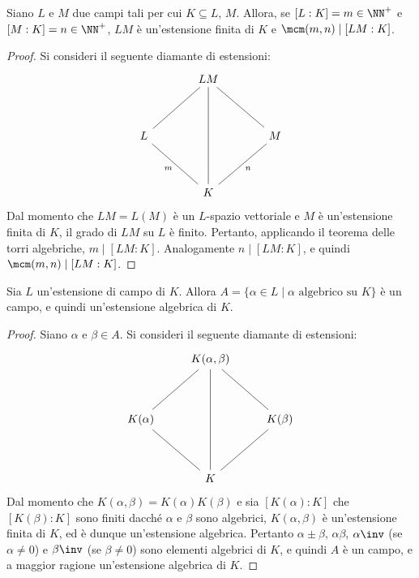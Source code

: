 \documentclass[12pt]{scrartcl}
\begin{document}
	\begin{proposition}
		Siano $L$ e $M$ due campi tali per cui
		$K \subseteq L$, $M$. Allora, se
		$[L : K] = m \in \NN^+$ e $[M : K] = n \in \NN^+$,
		$LM$ è un'estensione finita di $K$ e $\mcm(m, n) \mid [LM : K]$.
	\end{proposition}

	\begin{proof}
		Si consideri il seguente diamante di estensioni:
		\[\begin{tikzcd}[column sep=scriptsize]
			&& LM \\
			\\
			L &&&& M \\
			\\
			&& K
			\arrow["n", no head, from=3-5, to=5-3]
			\arrow["m"', no head, from=3-1, to=5-3]
			\arrow[no head, from=1-3, to=3-5]
			\arrow[no head, from=1-3, to=3-1]
			\arrow[no head, from=1-3, to=5-3]
		\end{tikzcd}\]
		Dal momento che $LM = L(M)$ è un $L$-spazio vettoriale
		e $M$ è un'estensione finita di $K$, il grado di $LM$
		su $L$ è finito. Pertanto, applicando il teorema delle
		torri algebriche, $m \mid [LM : K]$. Analogamente
		$n \mid [LM : K]$, e quindi $\mcm(m, n) \mid [LM : K]$.
	\end{proof}

	\begin{proposition}
		Sia $L$ un'estensione di campo di $K$. Allora
		$A = \{ \alpha \in L \mid \alpha \text{ algebrico su } K \}$ è un campo, e quindi un'estensione algebrica
		di $K$.
	\end{proposition}

	\begin{proof}
		Siano $\alpha$ e $\beta \in A$. Si consideri il
		seguente diamante di estensioni:
		\[\begin{tikzcd}[column sep=small]
			&& {K(\alpha, \beta)} \\
			\\
			{K(\alpha)} &&&& {K(\beta)} \\
			\\
			&& K
			\arrow[no head, from=3-5, to=5-3]
			\arrow[no head, from=3-1, to=5-3]
			\arrow[no head, from=1-3, to=3-5]
			\arrow[no head, from=1-3, to=3-1]
			\arrow[no head, from=1-3, to=5-3]
		\end{tikzcd}\]
		Dal momento che $K(\alpha, \beta) = K(\alpha)K(\beta)$
		e sia $[K(\alpha) : K]$ che $[K(\beta) : K]$ sono
		finiti dacché $\alpha$ e $\beta$ sono algebrici,
		$K(\alpha, \beta)$ è un'estensione finita di $K$,
		ed è dunque un'estensione algebrica. Pertanto
		$\alpha \pm \beta$, $\alpha\beta$, $\alpha\inv$
		(se $\alpha \neq 0$) e $\beta\inv$ (se $\beta \neq 0$) sono elementi algebrici di $K$,
		e quindi $A$ è un campo, e a maggior ragione un'estensione algebrica di $K$.
	\end{proof}
	
\end{document}
